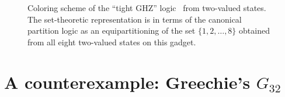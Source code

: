 \documentclass[%
12pt,
prereprint,
showpacs,
showkeys,
preprintnumbers,
amsmath,amssymb,
aps,
pra,
longbibliography,
notitlepage
]{revtex4-1}
\theoremstyle{definition}
\begin{document}
\begin{figure}
\begin{center}
		\end{center}
		\caption{\label{2020-f-GHZ}
			Coloring scheme of the ``tight GHZ'' logic~\cite{svozil-2020-ghz} from two-valued states.
			The set-theoretic representation is in terms of
			the canonical partition logic as an equipartitioning of the set $\{1,2,\ldots,8\}$
			obtained from all eight two-valued states on this gadget.
		}
	\end{figure}
	
	\section{A counterexample: Greechie's $G_{32}$}\label{2021-chroma-G32}
	
\end{document}
